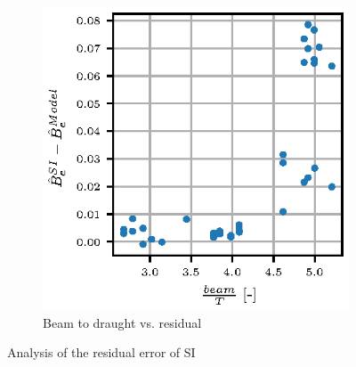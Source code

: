 \begin{figure}[H]
\begin{subfigure}[b]{0.4\textwidth}
        \includegraphics[width=\textwidth]{figures/beam_T_residual.eps}
        \caption{Beam to draught vs. residual}
        \label{fig:beam_T_residual}
    \end{subfigure}
    
    \caption{Analysis of the residual error of SI}\label{fig:validation}
\end{figure}



